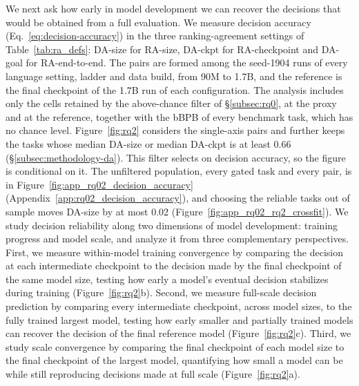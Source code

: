 We next ask how early in model development we can recover the decisions that would be obtained from a full evaluation.
We measure decision accuracy (Eq.~\ref{eq:decision-accuracy}) in the three ranking-agreement settings of Table~\ref{tab:ra_defs}: DA-size for RA-size, DA-ckpt for RA-checkpoint and DA-goal for RA-end-to-end.
The pairs are formed among the seed-1904 runs of every language setting, ladder and data build, from 90M to 1.7B, and the reference is the final checkpoint of the 1.7B run of each configuration.
The analysis includes only the cells retained by the above-chance filter of \S\ref{subsec:rq0}, at the proxy and at the reference, together with the bBPB of every benchmark task, which has no chance level.
Figure~\ref{fig:rq2} considers the single-axis pairs and further keeps the tasks whose median DA-size or median DA-ckpt is at least 0.66 (\S\ref{subsec:methodology-da}). This filter selects on decision accuracy, so the figure is conditional on it. The unfiltered population, every gated task and every pair, is in Figure~\ref{fig:app_rq02_decision_accuracy} (Appendix~\ref{app:rq02_decision_accuracy}), and choosing the reliable tasks out of sample moves DA-size by at most 0.02 (Figure~\ref{fig:app_rq02_rq2_crossfit}).
We study decision reliability along two dimensions of model development: training progress and model scale, and analyze it from three complementary perspectives. First, we measure within-model training convergence by comparing the decision at each intermediate checkpoint to the decision made by the final checkpoint of the same model size, testing how early a model's eventual decision stabilizes during training (Figure~\ref{fig:rq2}b). Second, we measure full-scale decision prediction by comparing every intermediate checkpoint, across model sizes, to the fully trained largest model, testing how early smaller and partially trained models can recover the decision of the final reference model (Figure~\ref{fig:rq2}c). Third, we study scale convergence by comparing the final checkpoint of each model size to the final checkpoint of the largest model, quantifying how small a model can be while still reproducing decisions made at full scale (Figure~\ref{fig:rq2}a).

